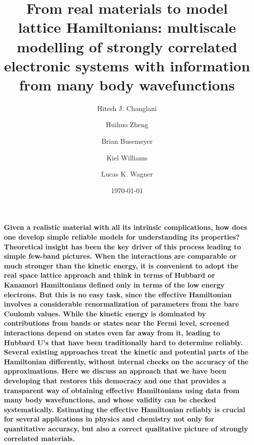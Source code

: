 \documentclass[prl,12pt,onecolumn,nofootinbib,notitlepage,english,superscriptaddress]{revtex4-1}
\begin{document}
\renewcommand{\thefootnote}{\fnsymbol{footnote}}
\renewcommand\abstractname{}
\title{From real materials to model lattice Hamiltonians: multiscale modelling of strongly correlated electronic systems 
       with information from many body wavefunctions}

\author{Hitesh J. Changlani}
\author{Huihuo Zheng}
\author{Brian Busemeyer}
\author{Kiel Williams}
\author{Lucas K. Wagner}
\date{\today}
\maketitle

\textbf{
Given a realistic material with all its intrinsic complications, how does one develop simple reliable 
models for understanding its properties? Theoretical insight has been the key driver of 
this process leading to simple few-band pictures. When the interactions are comparable or much stronger than 
the kinetic energy, it is convenient to adopt the real space lattice approach and think in terms of Hubbard or Kanamori Hamiltonians defined 
only in terms of the low energy electrons. 
But this is no easy task, since the effective Hamiltonian involves a considerable renormalization of parameters from the bare Coulomb values. 
While the kinetic energy is dominated by contributions from bands or states near the Fermi level, screened 
interactions depend on states even far away from it, leading to Hubbard U's 
that have been traditionally hard to determine reliably. 
Several existing approaches treat the kinetic and potential parts of the Hamiltonian differently,
without internal checks on the accuracy of the approximations. 
Here we discuss an approach that we have been developing that restores this democracy and 
one that provides a transparent 
way of obtaining effective Hamiltonians using data from many body wavefunctions, 
and whose validity can be checked systematically.
Estimating the effective Hamiltonian reliably is crucial for 
several applications in physics and chemistry not only for quantitative accuracy, but also a 
correct qualitative picture of strongly correlated materials. 
}
\end{document}
